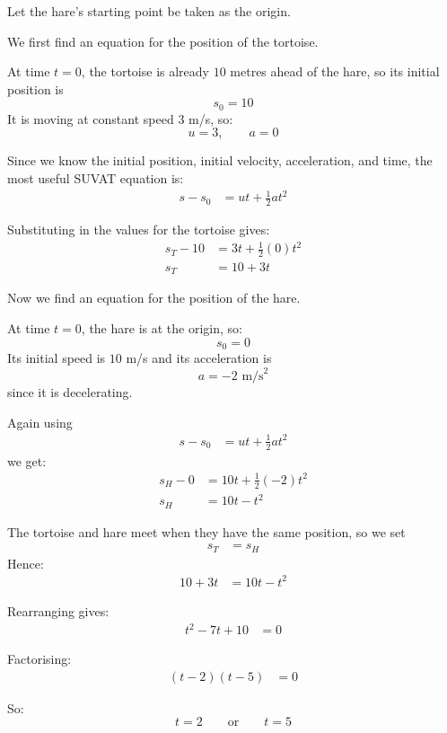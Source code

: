 \begin{solution}
Let the hare's starting point be taken as the origin.

We first find an equation for the position of the tortoise.

At time $t=0$, the tortoise is already $10$ metres ahead of the hare, so its initial position is
\[
s_0 = 10
\]
It is moving at constant speed $3$ m/s, so:
\[
u = 3, \qquad a = 0
\]

Since we know the initial position, initial velocity, acceleration, and time, the most useful SUVAT equation is:
\begin{align*}
    s - s_0 &= ut + \frac{1}{2}at^2
\end{align*}

Substituting in the values for the tortoise gives:
\begin{align*}
    s_T - 10 &= 3t + \frac{1}{2}(0)t^2 \\
    s_T &= 10 + 3t
\end{align*}

Now we find an equation for the position of the hare.

At time $t=0$, the hare is at the origin, so:
\[
s_0 = 0
\]
Its initial speed is $10$ m/s and its acceleration is
\[
a = -2 \text{ m/s}^2
\]
since it is decelerating.

Again using
\begin{align*}
    s - s_0 &= ut + \frac{1}{2}at^2
\end{align*}
we get:
\begin{align*}
    s_H - 0 &= 10t + \frac{1}{2}(-2)t^2 \\
    s_H &= 10t - t^2
\end{align*}

The tortoise and hare meet when they have the same position, so we set
\begin{align*}
    s_T &= s_H
\end{align*}
Hence:
\begin{align*}
    10 + 3t &= 10t - t^2
\end{align*}

Rearranging gives:
\begin{align*}
    t^2 - 7t + 10 &= 0
\end{align*}

Factorising:
\begin{align*}
    (t-2)(t-5) &= 0
\end{align*}

So:
\[
t=2 \qquad \text{or} \qquad t=5
\]


\end{solution}
